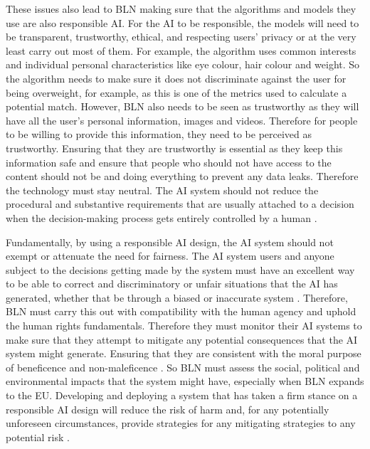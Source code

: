 \documentclass[a4paper,10pt]{article}
\begin{document}

These issues also lead to BLN making sure that the algorithms and models they use are also responsible AI. For the AI to be responsible, the models will need to be transparent, trustworthy, ethical, and respecting users' privacy \cite{berte_slides_ai_law_overview} or at the very least carry out most of them. For example, the algorithm uses common interests and individual personal characteristics like eye colour, hair colour and weight. So the algorithm needs to make sure it does not discriminate against the user for being overweight, for example, as this is one of the metrics used to calculate a potential match. However, BLN also needs to be seen as trustworthy as they will have all the user's personal information, images and videos. Therefore for people to be willing to provide this information, they need to be perceived as trustworthy. Ensuring that they are trustworthy is essential as they keep this information safe and ensure that people who should not have access to the content should not be and doing everything to prevent any data leaks. Therefore the technology must stay neutral. The AI system should not reduce the procedural and substantive requirements that are usually attached to a decision when the decision-making process gets entirely controlled by a human \cite{adam_slides_regulating_ai}.

Fundamentally, by using a responsible AI design, the AI system should not exempt or attenuate the need for fairness. The AI system users and anyone subject to the decisions getting made by the system must have an excellent way to be able to correct and discriminatory or unfair situations that the AI has generated, whether that be through a biased or inaccurate system \cite{adam_slides_regulating_ai}. Therefore, BLN must carry this out with compatibility with the human agency and uphold the human rights fundamentals. Therefore they must monitor their AI systems to make sure that they attempt to mitigate any potential consequences that the AI system might generate. Ensuring that they are consistent with the moral purpose of beneficence and non-maleficence \cite{adam_slides_regulating_ai}. So BLN must assess the social, political and environmental impacts that the system might have, especially when BLN expands to the EU. Developing and deploying a system that has taken a firm stance on a responsible AI design will reduce the risk of harm and, for any potentially unforeseen circumstances, provide strategies for any mitigating strategies to any potential risk \cite{adam_slides_regulating_ai}.
\end{document}
